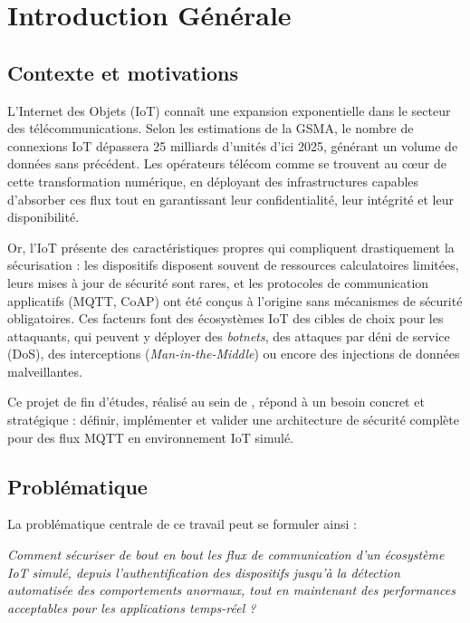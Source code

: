 \chapter{Introduction Générale}

\section{Contexte et motivations}

L'Internet des Objets (IoT) connaît une expansion exponentielle dans le secteur des télécommunications. Selon les estimations de la GSMA, le nombre de connexions IoT dépassera 25 milliards d'unités d'ici 2025, générant un volume de données sans précédent. Les opérateurs télécom comme \TT{} se trouvent au cœur de cette transformation numérique, en déployant des infrastructures capables d'absorber ces flux tout en garantissant leur confidentialité, leur intégrité et leur disponibilité.

Or, l'IoT présente des caractéristiques propres qui compliquent drastiquement la sécurisation : les dispositifs disposent souvent de ressources calculatoires limitées, leurs mises à jour de sécurité sont rares, et les protocoles de communication applicatifs (MQTT, CoAP) ont été conçus à l'origine sans mécanismes de sécurité obligatoires. Ces facteurs font des écosystèmes IoT des cibles de choix pour les attaquants, qui peuvent y déployer des \textit{botnets}, des attaques par déni de service (\ac{DoS}), des interceptions (\textit{Man-in-the-Middle}) ou encore des injections de données malveillantes.

Ce projet de fin d'études, réalisé au sein de \TT{}, répond à un besoin concret et stratégique : définir, implémenter et valider une architecture de sécurité complète pour des flux MQTT en environnement IoT simulé.

\section{Problématique}

La problématique centrale de ce travail peut se formuler ainsi :

\begin{tcolorbox}[colback=blue!5, colframe=blue!50!black, title=Problématique]
\textit{Comment sécuriser de bout en bout les flux de communication d'un écosystème IoT simulé, depuis l'authentification des dispositifs jusqu'à la détection automatisée des comportements anormaux, tout en maintenant des performances acceptables pour les applications temps-réel ?}
\end{tcolorbox}

